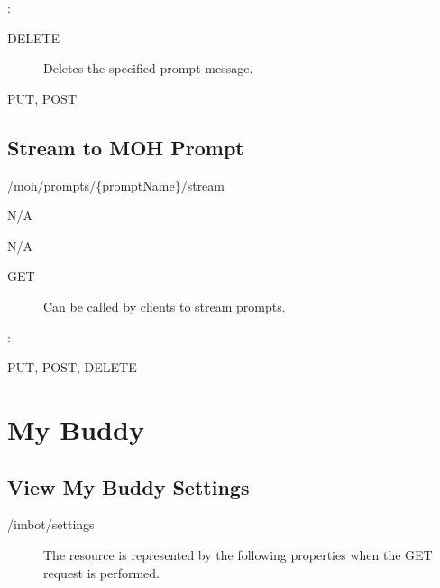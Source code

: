 \documentclass[letterpaper,10pt,english]{sphinxmanual}
\begin{document}
:

\begin{sphinxVerbatim}[commandchars=\\\{\}]
\end{sphinxVerbatim}
\begin{description}
\item[{ DELETE}] \leavevmode
Deletes the specified prompt message.

\end{description}

 PUT, POST


\subsection{Stream to MOH Prompt}
\label{\detokenize{restapi:stream-to-moh-prompt}}
 /moh/prompts/\{promptName\}/stream

 N/A

 N/A
\begin{description}
\item[{ GET}] \leavevmode
Can be called by clients to stream prompts.

\end{description}

:

\begin{sphinxVerbatim}[commandchars=\\\{\}]
\end{sphinxVerbatim}

 PUT, POST, DELETE


\section{My Buddy}
\label{\detokenize{restapi:my-buddy}}

\subsection{View My Buddy Settings}
\label{\detokenize{restapi:view-my-buddy-settings}}
 /imbot/settings
\begin{description}
\item[{}] \leavevmode
The resource is represented by the following properties when the GET request is performed.

\end{description}
\end{document}
